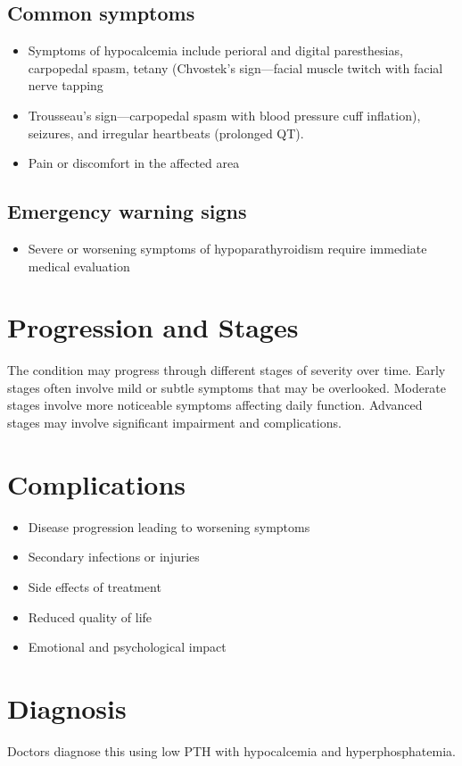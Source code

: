 \subsection{Common symptoms}
\begin{itemize}[noitemsep]
  \item Symptoms of hypocalcemia include perioral and digital paresthesias, carpopedal spasm, tetany (Chvostek's sign---facial muscle twitch with facial nerve tapping
  \item Trousseau's sign---carpopedal spasm with blood pressure cuff inflation), seizures, and irregular heartbeats (prolonged QT).
  \item Pain or discomfort in the affected area
  \end{itemize}
\subsection{Emergency warning signs}
\begin{itemize}[noitemsep]
  \item Severe or worsening symptoms of hypoparathyroidism require immediate medical evaluation
\end{itemize}
\section{Progression and Stages}
The condition may progress through different stages of severity over time. Early stages often involve mild or subtle symptoms that may be overlooked. Moderate stages involve more noticeable symptoms affecting daily function. Advanced stages may involve significant impairment and complications.
\section{Complications}
\begin{itemize}[noitemsep]
  \item Disease progression leading to worsening symptoms
  \item Secondary infections or injuries
  \item Side effects of treatment
  \item Reduced quality of life
  \item Emotional and psychological impact
\end{itemize}
\section{Diagnosis}
Doctors diagnose this using low PTH with hypocalcemia and hyperphosphatemia.

